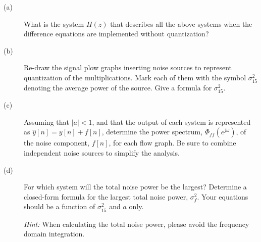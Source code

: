 \documentclass[12pt]{report}
\begin{document}
\begin{description}
	\item[(a)] What is the system $H(z)$ that describes all the above systems when the difference equations are implemented without quantization?
	\item[(b)] Re-draw the signal plow graphs inserting noise sources to represent quantization of the multiplications. Mark each of them with the symbol $\sigma_{15}^2$ denoting the average power of the source. Give a formula for $\sigma_{15}^2$.
	\item[(c)] Assuming that $|a|<1$, and that the output of each system is represented as $\hat{y}[n] = y[n] + f[n]$, determine the power spectrum, $\Phi_{ff}(e^{j\omega})$, of the noise component, $f[n]$, for each flow graph. Be sure to combine independent noise sources to simplify the analysis.
	\item[(d)] For which system will the total noise power be the largest? Determine a closed-form formula for the largest total noise power, $\sigma_f^2$. Your equations should be a function of $\sigma_{15}^2$ and $a$ only.
	
\textit{Hint:} When calculating the total noise power, please avoid the frequency domain integration.
\end{description}


\end{document}
